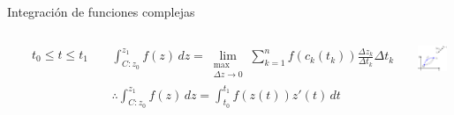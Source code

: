 \documentclass[9pt, aspectratio=169]{beamer}
\begin{document}
\begin{frame}{Integración de funciones complejas}
\begin{columns}[t]
   $\qquad t_0 \leq t \leq t_1$ 

   \begin{multline*} \int_{C: z_0}^{z_1} f(z) \, dz = \lim_{\substack{\max \\ \Delta z \rightarrow 0}} \sum_{k=1}^n f(c_k(t_k)) \frac{\Delta z_k}{\Delta t_k} \Delta t_k \\
       \therefore \int_{C: z_0}^{z_1} f(z) \, dz = \int_{t_0}^{t_1} f(z(t)) z'(t) \, dt
   \end{multline*}

  \vspace{2em}
  \begin{center}
      \includegraphics[width=0.85\textwidth]{figs/fig-07.pdf}
  \end{center}
\end{columns}
\end{frame}
\end{document}
